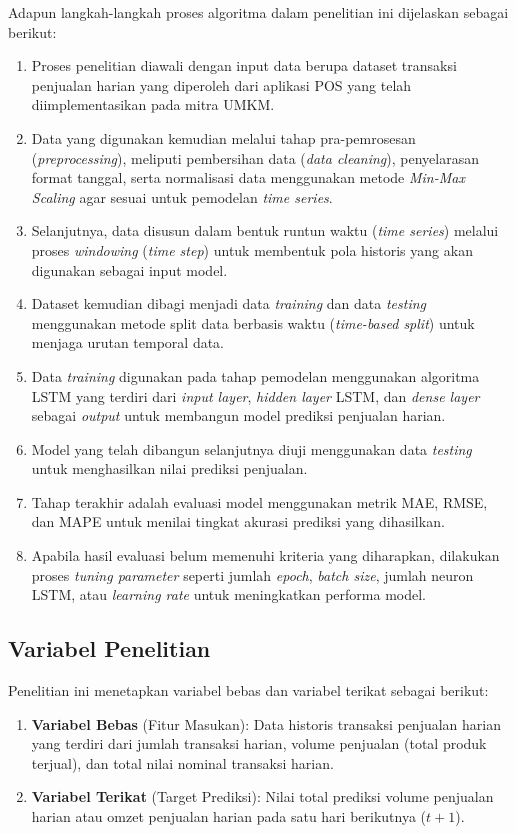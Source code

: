 Adapun langkah-langkah proses algoritma dalam penelitian ini dijelaskan sebagai berikut:
\begin{enumerate}
    \item Proses penelitian diawali dengan input data berupa dataset transaksi penjualan harian yang diperoleh dari aplikasi POS yang telah diimplementasikan pada mitra UMKM.
    \item Data yang digunakan kemudian melalui tahap pra-pemrosesan (\textit{preprocessing}), meliputi pembersihan data (\textit{data cleaning}), penyelarasan format tanggal, serta normalisasi data menggunakan metode \textit{Min-Max Scaling} agar sesuai untuk pemodelan \textit{time series}.
    \item Selanjutnya, data disusun dalam bentuk runtun waktu (\textit{time series}) melalui proses \textit{windowing} (\textit{time step}) untuk membentuk pola historis yang akan digunakan sebagai input model.
    \item Dataset kemudian dibagi menjadi data \textit{training} dan data \textit{testing} menggunakan metode split data berbasis waktu (\textit{time-based split}) untuk menjaga urutan temporal data.
    \item Data \textit{training} digunakan pada tahap pemodelan menggunakan algoritma LSTM yang terdiri dari \textit{input layer}, \textit{hidden layer} LSTM, dan \textit{dense layer} sebagai \textit{output} untuk membangun model prediksi penjualan harian.
    \item Model yang telah dibangun selanjutnya diuji menggunakan data \textit{testing} untuk menghasilkan nilai prediksi penjualan.
    \item Tahap terakhir adalah evaluasi model menggunakan metrik MAE, RMSE, dan MAPE untuk menilai tingkat akurasi prediksi yang dihasilkan.
    \item Apabila hasil evaluasi belum memenuhi kriteria yang diharapkan, dilakukan proses \textit{tuning parameter} seperti jumlah \textit{epoch}, \textit{batch size}, jumlah neuron LSTM, atau \textit{learning rate} untuk meningkatkan performa model.
\end{enumerate}

\subsection{Variabel Penelitian}
Penelitian ini menetapkan variabel bebas dan variabel terikat sebagai berikut:
\begin{enumerate}
    \item \textbf{Variabel Bebas} (Fitur Masukan): Data historis transaksi penjualan harian yang terdiri dari jumlah transaksi harian, volume penjualan (total produk terjual), dan total nilai nominal transaksi harian.
    \item \textbf{Variabel Terikat} (Target Prediksi): Nilai total prediksi volume penjualan harian atau omzet penjualan harian pada satu hari berikutnya ($t+1$).
\end{enumerate}

